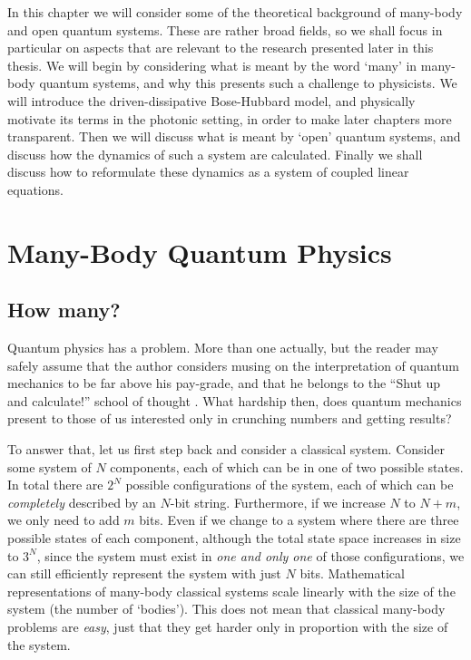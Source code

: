 In this chapter we will consider some of the theoretical background of many-body and open quantum systems. These are rather broad fields, so we shall focus in particular on aspects that are relevant to the research presented later in this thesis. We will begin by considering what is meant by the word `many' in many-body quantum systems, and why this presents such a challenge to physicists. We will introduce the driven-dissipative Bose-Hubbard model, and physically motivate its terms in the photonic setting, in order to make later chapters more transparent. Then we will discuss what is meant by `open' quantum systems, and discuss how the dynamics of such a system are calculated. Finally we shall discuss how to reformulate these dynamics as a system of coupled linear equations.  

\section{Many-Body Quantum Physics}

\subsection{How many?}
Quantum physics has a problem. More than one actually, but the reader may safely assume that the author considers musing on the interpretation of quantum mechanics to be far above his pay-grade, and that he belongs to the ``Shut up and calculate!'' school of thought \cite{Mermin1989}. What hardship then, does quantum mechanics present to those of us interested only in crunching numbers and getting results? 

To answer that, let us first step back and consider a classical system. Consider some system of \(N\) components, each of which can be in one of two possible states. In total there are \(2^{N}\) possible configurations of the system, each of which can be \emph{completely} described by an \(N\)-bit string. Furthermore, if we increase \(N\) to \(N+m\), we only need to add \(m\) bits. Even if we change to a system where there are three possible states of each component, although the total state space increases in size to \(3^{N}\), since the system must exist in \emph{one and only one} of those configurations, we can still efficiently represent the system with just \(N\) bits. Mathematical representations of many-body classical systems scale linearly with the size of the system (the number of `bodies'). This does not mean that classical many-body problems are \emph{easy}, just that they get harder only in proportion with the size of the system.  

